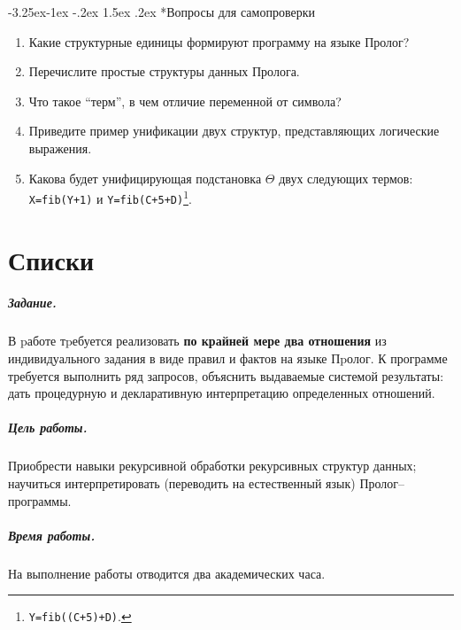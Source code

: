 \documentclass[12pt, openany, oneside]{book} %
\makeatletter
\renewcommand\subsubsection{\@startsection{subsubsection}{3}{\z@}%
                                     {-3.25ex\@plus -1ex \@minus -.2ex}%
                                     {1.5ex \@plus .2ex}%
                                     {\normalfont\normalsize\bfseries}}
\newenvironment{questions}{\subsubsection*{Вопросы для самопроверки}\begin{enumerate}}{\end{enumerate}}
\makeatother
\begin{document}
\begin{questions}
\item{} Какие структурные единицы формируют программу на языке Пролог?
\item{} Перечислите простые структуры данных Пролога.
\item{} Что такое ``терм'', в чем отличие переменной от символа?
\item{} Приведите пример унификации двух структур, представляющих логические выражения.
\item{} Какова будет унифицирующая подстановка $\Theta$ двух следующих термов: \texttt{X=fib(Y+1)} и \texttt{Y=fib(C+5+D)}\footnote{\texttt{Y=fib((C+5)+D)}.}.
\end{questions}

\chapter{Списки}

\paragraph{Задание.} В pаботе тpебуется реализовать {\bf по крайней мере два отношения} из индивидуального задания в виде правил и фактов на языке Пpолог. К программе требуется выполнить ряд запросов, объяснить выдаваемые системой результаты: дать процедурную и декларативную интерпретацию определенных отношений.

\paragraph{Цель работы.} Приобрести навыки рекурсивной обработки рекурсивных структур данных; научиться интерпретировать (переводить на естественный язык) Пролог--программы.

\paragraph{Время работы.} На выполнение работы отводится два академических часа.
\end{document}
